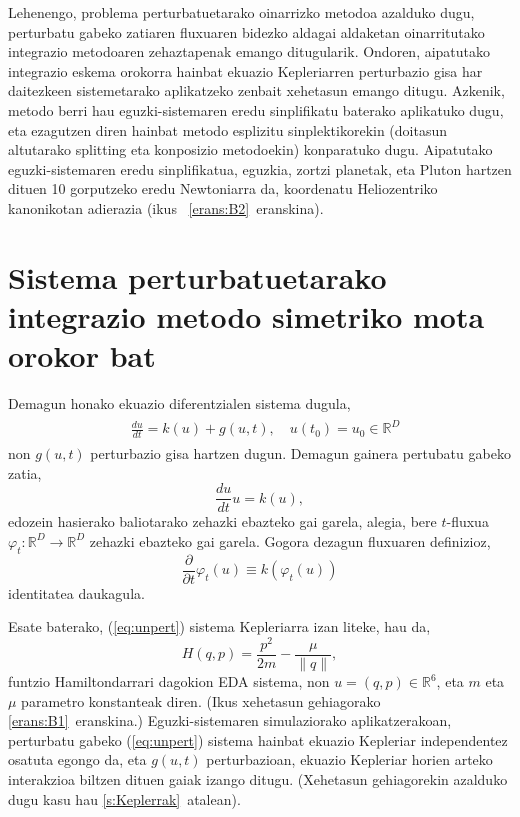  Lehenengo, problema perturbatuetarako oinarrizko metodoa azalduko dugu,  perturbatu gabeko zatiaren fluxuaren bidezko aldagai aldaketan oinarritutako   integrazio metodoaren zehaztapenak emango ditugularik.
Ondoren, aipatutako integrazio eskema orokorra  hainbat ekuazio Kepleriarren perturbazio gisa har daitezkeen sistemetarako aplikatzeko zenbait xehetasun emango ditugu.  Azkenik,  metodo berri hau eguzki-sistemaren eredu sinplifikatu baterako aplikatuko dugu, eta ezagutzen diren hainbat metodo esplizitu sinplektikorekin (doitasun altutarako splitting eta konposizio metodoekin) konparatuko dugu.
Aipatutako eguzki-sistemaren eredu sinplifikatua, eguzkia, zortzi planetak, eta Pluton hartzen dituen 10 gorputzeko eredu Newtoniarra da, koordenatu Heliozentriko kanonikotan adierazia  (ikus ~\ref{erans:B2}~eranskina).

 
\section{Sistema perturbatuetarako integrazio metodo simetriko mota orokor bat}
 \label{s:metodoberria}


 Demagun honako ekuazio diferentzialen sistema dugula,
\begin{align}
\begin{split}
\label{eq:pertEDA}
&\frac{du}{dt} = k(u) + g(u,t), \quad  u(t_0) = u_0 \in \mathbb{R}^D
\end{split}
\end{align}
non $g(u,t)$ perturbazio gisa hartzen dugun. Demagun gainera pertubatu gabeko zatia,
\begin{equation}
\label{eq:unpert}
\frac{du}{dt} u = k(u),
\end{equation}
%
edozein hasierako baliotarako zehazki ebazteko gai garela, alegia, bere $t$-fluxua $\varphi_{t}: \mathbb{R}^{D} \to \mathbb{R}^{D}$
 zehazki ebazteko gai garela. Gogora dezagun fluxuaren definizioz,
 \begin{equation}
 \label{eq:fluxudef}
\frac{\partial}{\partial t} \varphi_{t}(u) \equiv k(\varphi_{t}(u))
\end{equation}
%
identitatea daukagula.

Esate baterako,   (\ref{eq:unpert}) sistema Kepleriarra izan liteke, hau da,
\begin{equation}
\label{eq: hamkepler}
H(q,p)=\frac{p^2}{2m}-\frac{\mu}{\|q\|},
\end{equation}
funtzio Hamiltondarrari dagokion EDA sistema, non $u=(q,p) \in \mathbb{R}^{6}$, eta
$m$ eta $\mu$ parametro konstanteak diren. (Ikus xehetasun gehiagorako \ref{erans:B1}~eranskina.)
Eguzki-sistemaren simulaziorako aplikatzerakoan, perturbatu gabeko (\ref{eq:unpert}) sistema hainbat ekuazio Kepleriar independentez osatuta egongo da, eta $g(u,t)$ perturbazioan, ekuazio Kepleriar horien arteko interakzioa biltzen dituen gaiak izango ditugu. (Xehetasun gehiagorekin azalduko dugu kasu hau \ref{s:Keplerrak}~atalean).


